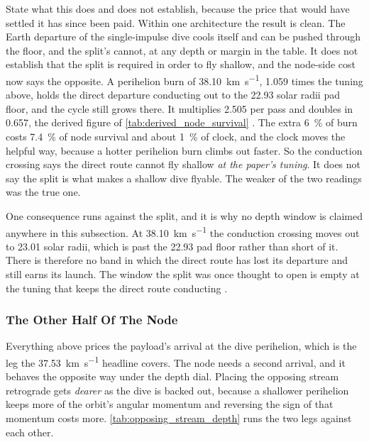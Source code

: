 \documentclass{article}
\begin{document}
State what this does and does not establish, because the price that would have settled it has since been paid. Within one architecture the result is clean. The Earth departure of the single-impulse dive cools itself and can be pushed through the floor, and the split's cannot, at any depth or margin in the table. It does not establish that the split is required in order to fly shallow, and the node-side cost now says the opposite. A perihelion burn of \SI{38.10}{\kilo\meter\per\second}, \num{1.059} times the tuning above, holds the direct departure conducting out to the \num{22.93} solar radii pad floor, and the cycle still grows there. It multiplies \num{2.505} per pass and doubles in \SI{0.657}{\year}, the derived figure of \autoref{tab:derived_node_survival} \cite{Katz_aim_is_all_you_need_2025}. The extra \SI{6}{\percent} of burn costs \SI{7.4}{\percent} of node survival and about \SI{1}{\percent} of clock, and the clock moves the helpful way, because a hotter perihelion burn climbs out faster. So the conduction crossing says the direct route cannot fly shallow \emph{at the paper's tuning}. It does not say the split is what makes a shallow dive flyable. The weaker of the two readings was the true one.

One consequence runs against the split, and it is why no depth window is claimed anywhere in this subsection. At \SI{38.10}{\kilo\meter\per\second} the conduction crossing moves out to \num{23.01} solar radii, which is past the \num{22.93} pad floor rather than short of it. There is therefore no band in which the direct route has lost its departure and still earns its launch. The window the split was once thought to open is empty at the tuning that keeps the direct route conducting \cite{Katz_aim_is_all_you_need_2025}.

\subsubsection{The Other Half Of The Node}\label{sec:opposing_stream_depth}
Everything above prices the payload's arrival at the dive perihelion, which is the leg the \SI{37.53}{\kilo\meter\per\second} headline covers. The node needs a second arrival, and it behaves the opposite way under the depth dial. Placing the opposing stream retrograde gets \emph{dearer} as the dive is backed out, because a shallower perihelion keeps more of the orbit's angular momentum and reversing the sign of that momentum costs more. \autoref{tab:opposing_stream_depth} runs the two legs against each other.
\end{document}
